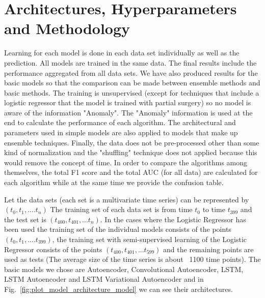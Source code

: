 \documentclass[a4paper,12pt]{report}
\theoremstyle{definitionNODot}
\begin{document}
	\section{Architectures, Hyperparameters and Methodology}
	
	Learning for each model is done in each data set individually as well as the prediction. All models are trained in the same data. The final results include the performance aggregated from all data sets. We have also produced results for the basic models so that the comparison can be made between ensemble methods and basic methods. The training is unsupervised (except for techniques that include a logistic regressor that the model is trained with partial surgery) so no model is aware of the information "Anomaly". The "Anomaly" information is used at the end to calculate the performance of each algorithm. The architectural and parameters used in simple models are also applied to models that make up ensemble techniques. Finally, the data does not be pre-processed other than some kind of normalization and the "shuffling" technique does not applied because this would remove the concept of time. In order to compare the algorithms among themselves, the total F1 score and the total AUC (for all data) are calculated for each algorithm while at the same time we provide the confusion table.
	
	Let the data sets (each set is a multivariate time series) can be represented by $(t_0, t_1,....t_n)$ The training set of each data set is from time $t_0$ to time $t_{ 399}$ and the test set is $(t_{400}, t_{401},...t_n)$. In the cases where the Logistic Regressor has been used the training set of the individual models consists of the points $(t_0, t_1,....t_{399})$, the training set with semi-supervised learning of the Logistic Regressor consists of the points $(t_{400}, t_{401},...t_{599})$ and the remaining points are used as tests (The average size of the time series is about ~1100 time points). The basic models we chose are Autoencoder, Convolutional Autoencoder, LSTM, LSTM Autoencoder and LSTM Variational Autoencoder and in Fig.~\ref{fig:plot_model_architecture_model} we can see their architectures.
	
\end{document}
